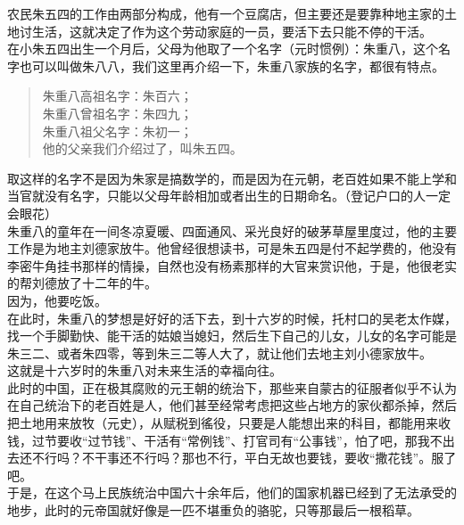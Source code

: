 \begin{multicols}{\theparacolNo}
农民朱五四的工作由两部分构成，他有一个豆腐店，但主要还是要靠种地主家的土地讨生活，这就决定了作为这个劳动家庭的一员，要活下去只能不停的干活。\\

在小朱五四出生一个月后，父母为他取了一个名字（元时惯例）：朱重八，这个名字也可以叫做朱八八，我们这里再介绍一下，朱重八家族的名字，都很有特点。\\

{\footnotesize \begin{quote}
	朱重八高祖名字：朱百六；\\
	朱重八曾祖名字：朱四九；\\
	朱重八祖父名字：朱初一；\\
	他的父亲我们介绍过了，叫朱五四。\\
\end{quote}}

取这样的名字不是因为朱家是搞数学的，而是因为在元朝，老百姓如果不能上学和当官就没有名字，只能以父母年龄相加或者出生的日期命名。（登记户口的人一定会眼花）\\

朱重八的童年在一间冬凉夏暖、四面通风、采光良好的破茅草屋里度过，他的主要工作是为地主刘德家放牛。他曾经很想读书，可是朱五四是付不起学费的，他没有李密牛角挂书那样的情操，自然也没有杨素那样的大官来赏识他，于是，他很老实的帮刘德放了十二年的牛。\\

因为，他要吃饭。\\

在此时，朱重八的梦想是好好的活下去，到十六岁的时候，托村口的吴老太作媒，找一个手脚勤快、能干活的姑娘当媳妇，然后生下自己的儿女，儿女的名字可能是朱三二、或者朱四零，等到朱三二等人大了，就让他们去地主刘小德家放牛。\\

这就是十六岁时的朱重八对未来生活的幸福向往。\\

此时的中国，正在极其腐败的元王朝的统治下，那些来自蒙古的征服者似乎不认为在自己统治下的老百姓是人，他们甚至经常考虑把这些占地方的家伙都杀掉，然后把土地用来放牧（元史），从赋税到徭役，只要是人能想出来的科目，都能用来收钱，过节要收“过节钱”、干活有“常例钱”、打官司有“公事钱”，怕了吧，那我不出去还不行吗？不干事还不行吗？那也不行，平白无故也要钱，要收“撒花钱”。服了吧。\\

于是，在这个马上民族统治中国六十余年后，他们的国家机器已经到了无法承受的地步，此时的元帝国就好像是一匹不堪重负的骆驼，只等那最后一根稻草。\\


\end{multicols}
